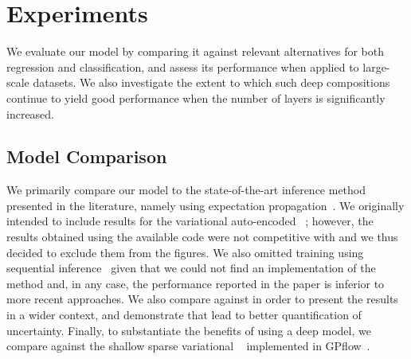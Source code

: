 \section{Experiments}

We  evaluate our model by comparing it against relevant alternatives for both regression and classification, and assess its performance when applied to large-scale datasets.
We also investigate the extent to which such deep compositions continue to yield good performance when the number of layers is significantly increased.

\subsection{Model Comparison}



We primarily compare our model to the state-of-the-art \dgp inference method presented in the literature, namely  using expectation propagation~\citep[\dgpep;][]{Bui16}.
We originally intended to include results for the variational auto-encoded \dgp~\citep{Damianou13}; however, the results obtained using the available code were not competitive with \dgpep and we thus decided to exclude them from the figures.
We also omitted \dgp training using sequential inference~\citep{Wang16} given that we could not find an implementation of the method and, in any case, the performance reported in the paper is inferior to more recent approaches.
We also compare against  in order to present the results in a wider context, and demonstrate that  lead to better quantification of uncertainty.
Finally, to substantiate the benefits of using a deep model, we  compare against the shallow sparse variational \gp~\cite{HensmanMG15} implemented in GPflow~\cite{GPflow2016}.

